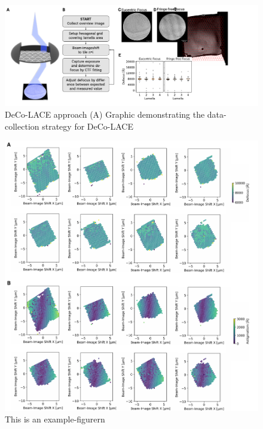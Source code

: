 \documentclass[
]{article}
\begin{document}
\begin{figure}
\hypertarget{fig:approach}{%
\centering
\includegraphics{figures/approach.pdf}
\caption{DeCo-LACE approach (A) Graphic demonstrating the data-collection strategy for DeCo-LACE}\label{fig:approach}
}
\end{figure}

\begin{figure}
\hypertarget{fig:lamella_spatial_info}{%
\centering
\includegraphics{figures/lamella_spatial_info.pdf}
\caption{This is an example-figurern}\label{fig:lamella_spatial_info}
}
\end{figure}
\end{document}
